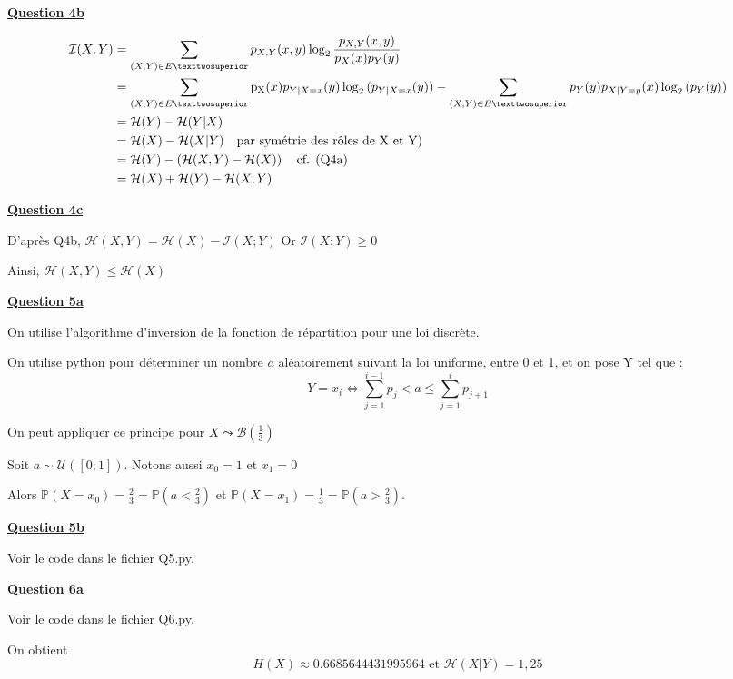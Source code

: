 \documentclass[a4paper,twoside,10pt]{article}
\renewcommand{\H}{\mathcal{H}}
\newcommand{\I}{\mathcal{I}}
\newcommand{\B}{\mathcal{B}}
\newenvironment{Q}[1]{%
\vspace{1ex}
\underline{\textbf{Question #1\\}}
\newline
}{
\vspace{2ex}
}
\begin{document}
\begin{Q}{4b}

\begin{align*}
 \I(X,Y) &= \sum_{(X,Y) \in E²} p_{X,Y}(x,y)
				\log_2{\frac{p_{X,Y}{(x,y)}}{p_X(x)p_Y(y)}} \\
	&= \sum_{(X,Y) \in E²}
		\operatorname{p_X}(x) p_{Y|X=x}(y) \log_2{(p_{Y|X=x}(y))} 
 		- \sum_{(X,Y) \in E²}
 			p_Y(y) p_{X|Y=y}(x) \log_2{(p_{Y}(y))} \\
	&= \H(Y) - \H(Y|X) \\
	&= \H(X) - \H(X|Y) \text{\quad par symétrie des rôles de X et Y)} \\
	&= \H(Y) - \left(\H(X,Y) - \H(X)\right) \text{\quad cf. (Q4a)} \\
	&= \H(X) + \H(Y) - \H(X,Y)
\end{align*}
\end{Q}

\begin{Q}{4c}

D'après Q4b, $\H(X,Y) = \H(X) - \I(X;Y)$ Or $\I(X;Y) \geq 0$

Ainsi, $\H(X,Y) \leq \H(X)$
\end{Q}

\begin{Q}{5a}

On utilise l'algorithme d'inversion de la fonction de répartition pour une loi discrète.

On utilise python pour déterminer un nombre $a$ aléatoirement suivant la loi uniforme, entre 0 et 1, et on pose Y tel que : 
\[
Y = x_i  \iff \sum_{j = 1}^{i-1} p_j < a \leq \sum_{j = 1}^{i} p_{j+1}
\]

On peut appliquer ce principe pour $X \leadsto \B(\frac{1}{3})$

Soit $a \sim \mathcal{U}([0;1])$. Notons aussi $x_0 = 1$ et $x_1 = 0$

Alors $\mathbb{P}(X = x_0) = \frac{2}{3} = \mathbb{P}(a < \frac{2}{3})$ et 
$\mathbb{P}(X = x_1) = \frac{1}{3} = \mathbb{P}(a > \frac{2}{3})$.
\end{Q}

\begin{Q}{5b}
Voir le code dans le fichier Q5.py.
\end{Q}

\begin{Q}{6a}
Voir le code dans le fichier Q6.py.

On obtient \[H(X) \approx 0.6685644431995964 \text{ et } \H(X|Y) = 1,25\]
\end{Q}
\end{document}
